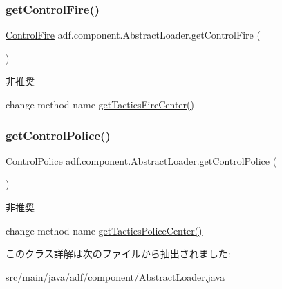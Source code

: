 \subsubsection{\texorpdfstring{get\+Control\+Fire()}{getControlFire()}}
{\footnotesize\ttfamily \hyperlink{classadf_1_1component_1_1control_1_1ControlFire}{Control\+Fire} adf.\+component.\+Abstract\+Loader.\+get\+Control\+Fire (\begin{DoxyParamCaption}{ }\end{DoxyParamCaption})}

\begin{DoxyRefDesc}{非推奨}
\item[\hyperlink{deprecated__deprecated000007}{非推奨}]change method name \hyperlink{}{get\+Tactics\+Fire\+Center()} \end{DoxyRefDesc}
\hypertarget{classadf_1_1component_1_1AbstractLoader_a2917adfedf677a3af006521e64996a42}{}\label{classadf_1_1component_1_1AbstractLoader_a2917adfedf677a3af006521e64996a42} 
\subsubsection{\texorpdfstring{get\+Control\+Police()}{getControlPolice()}}
{\footnotesize\ttfamily \hyperlink{classadf_1_1component_1_1control_1_1ControlPolice}{Control\+Police} adf.\+component.\+Abstract\+Loader.\+get\+Control\+Police (\begin{DoxyParamCaption}{ }\end{DoxyParamCaption})}

\begin{DoxyRefDesc}{非推奨}
\item[\hyperlink{deprecated__deprecated000008}{非推奨}]change method name \hyperlink{}{get\+Tactics\+Police\+Center()} \end{DoxyRefDesc}


このクラス詳解は次のファイルから抽出されました\+:\begin{DoxyCompactItemize}
\item 
src/main/java/adf/component/Abstract\+Loader.\+java\end{DoxyCompactItemize}
